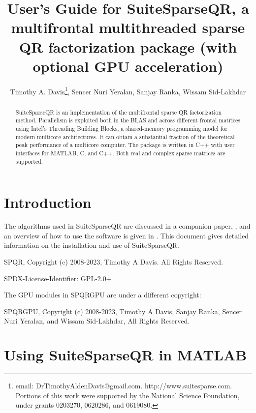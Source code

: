 \documentclass[12pt]{article}
\title{User's Guide for SuiteSparseQR, a multifrontal multithreaded sparse
QR factorization package (with optional GPU acceleration)}
\author{Timothy A. Davis\thanks{
email: DrTimothyAldenDavis@gmail.com.
http://www.suitesparse.com.
Portions of this work were supported by the National
Science Foundation, under grants 0203270, 0620286, and 0619080.},
Sencer Nuri Yeralan, Sanjay Ranka, Wissam Sid-Lakhdar}
\begin{document}
\maketitle

\begin{abstract}

SuiteSparseQR is an implementation of the multifrontal sparse QR factorization
method.  Parallelism is exploited both in the BLAS and across different frontal
matrices using Intel's Threading Building Blocks, a shared-memory programming
model for modern multicore architectures.  It can obtain a substantial fraction
of the theoretical peak performance of a multicore computer.  The package is
written in C++ with user interfaces for MATLAB, C, and C++.  Both real and
complex sparse matrices are supported.

\end{abstract}

\maketitle

\section{Introduction}
\label{intro}

The algorithms used in SuiteSparseQR are discussed in a companion paper,
\cite{Davis08a}, and an overview of how to use the software is given in
\cite{Davis08b}.  This document gives detailed information on the installation
and use of SuiteSparseQR.

SPQR, Copyright (c) 2008-2023, Timothy A Davis. All Rights Reserved.

SPDX-License-Identifier: GPL-2.0+

The GPU modules in SPQRGPU are under a different copyright:

    SPQRGPU, Copyright (c) 2008-2023, Timothy A Davis, Sanjay Ranka,
    Sencer Nuri Yeralan, and Wissam Sid-Lakhdar, All Rights Reserved.

\section{Using SuiteSparseQR in MATLAB}
\end{document}
